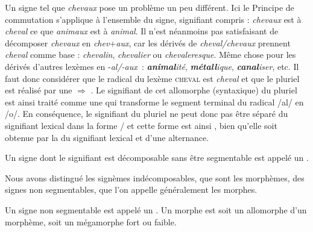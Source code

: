 Un signe tel que \textit{chevaux}  pose un problème un peu différent. Ici le Principe de commutation s’applique à l’ensemble du signe, signifiant compris : \textit{chevaux} est à \textit{cheval} ce que \textit{animaux} est à \textit{animal}. Il n’est néanmoins pas satisfaisant de décomposer \textit{chevaux} en \textit{chev}+\textit{aux}, car les dérivés de \textit{cheval/chevaux} prennent \textit{cheval} comme base : \textit{chevalin}, \textit{chevalier} ou \textit{chevaleresque}. Même chose pour les dérivés d’autres lexèmes en -\textit{al/-aux~}: \textbf{\textit{animal}}\textit{ité}, \textbf{\textit{métall}}\textit{ique}, \textbf{\textit{canal}}\textit{iser}, etc. Il faut donc considérer que le radical du lexème \textsc{cheval} est \textit{cheval} et que le pluriel est réalisé par une   ${\Rightarrow}$ . Le signifiant de cet allomorphe (syntaxique) du pluriel est ainsi traité comme une  qui transforme le segment terminal du radical /al/ en /o/. En conséquence, le signifiant du pluriel ne peut donc pas être séparé du signifiant lexical dans la forme / et cette forme est ainsi , bien qu’elle soit obtenue par la  du signifiant lexical et d’une alternance.

{Un signe dont le signifiant est décomposable sans être segmentable est appelé un .}

Nous avons distingué les signèmes indécomposables, que sont les morphèmes, des signes non segmentables, que l'on appelle généralement les morphes.

{Un signe non segmentable est appelé un . Un morphe est soit un allomorphe d'un morphème, soit un mégamorphe fort ou faible.}




